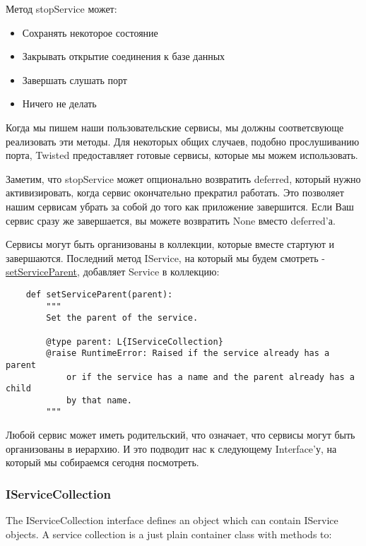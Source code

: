 Метод stopService может:

\begin{itemize}
\item Сохранять некоторое состояние
\item Закрывать открытие соединения к базе данных
\item Завершать слушать порт
\item Ничего не делать 
\end{itemize}


Когда мы пишем наши пользовательские сервисы, мы должны 
соответсвующе реализовать эти методы. 
Для некоторых общих случаев, подобно прослушиванию порта, 
Twisted предоставляет готовые сервисы, которые мы можем использовать. 


Заметим, что stopService может опционально возвратить deferred, 
который нужно активизировать, когда сервис окончательно 
прекратил работать. Это позволяет нашим сервисам убрать за собой 
до того как приложение завершится. Если Ваш сервис сразу же завершается, 
вы можете возвратить None вместо deferred'а.  


Сервисы могут быть организованы в коллекции, которые вместе  
стартуют и завершаются. Последний метод IService, на который мы будем 
смотреть - 
\href{http://twistedmatrix.com/trac/browser/tags/releases/twisted-10.0.0/twisted/application/service.py#L107}{setServiceParent}, добавляет Service в коллекцию:

 \begin{verbatim}
    def setServiceParent(parent):
        """
        Set the parent of the service.

        @type parent: L{IServiceCollection}
        @raise RuntimeError: Raised if the service already has a parent
            or if the service has a name and the parent already has a child
            by that name.
        """
\end{verbatim} 


Любой сервис может иметь родительский, что означает, что 
сервисы могут быть организованы в иерархию. И это подводит нас 
к следующему Interface'у, на который мы собираемся сегодня посмотреть.


\subsubsection{IServiceCollection}

The IServiceCollection interface defines an object which can contain IService objects. A service collection is a just plain container class with methods to:


